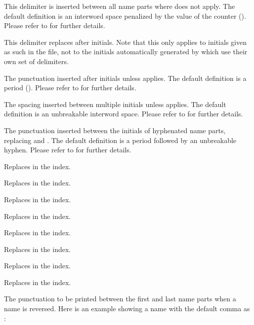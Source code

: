 \begin{ltxsyntax}
This delimiter is inserted between all name parts where  does not apply. The default definition is an interword space penalized by the value of the  counter (). Please refer to  for further details.

\BiberOnlyMark
This delimiter replaces  after initials. Note that this only applies to initials given as such in the  file, not to the initials automatically generated by \biblatex which use their own set of delimiters.

\BiberOnlyMark
The punctuation inserted after initials unless  applies. The default definition is a period (). Please refer to  for further details.

\BiberOnlyMark
The spacing inserted between multiple initials unless  applies. The default definition is an unbreakable interword space. Please refer to  for further details.

\BiberOnlyMark
The punctuation inserted between the initials of hyphenated name parts, replacing  and . The default definition is a period followed by an unbreakable hyphen. Please refer to  for further details.

Replaces  in the index.

Replaces  in the index.

Replaces  in the index.

Replaces  in the index.

Replaces  in the index.

Replaces  in the index.

Replaces  in the index.

Replaces  in the index.

The punctuation to be printed between the first and last name parts when a name is reversed. Here is an example showing a name with the default comma as :


\end{ltxsyntax}
